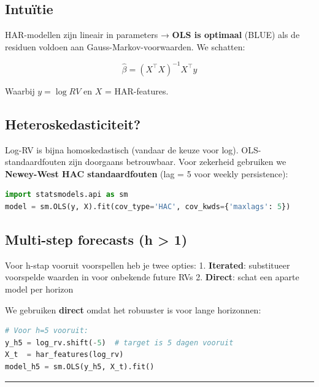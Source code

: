 \hypertarget{intuuxeftie-4}{%
\subsection{Intuïtie}\label{intuuxeftie-4}}

HAR-modellen zijn lineair in parameters → \textbf{OLS is optimaal} (BLUE) als de residuen voldoen aan Gauss-Markov-voorwaarden. We schatten:

\[\hat\beta = (X^\top X)^{-1} X^\top y\]

Waarbij \(y = \log RV\) en \(X\) = HAR-features.

\hypertarget{heteroskedasticiteit}{%
\subsection{Heteroskedasticiteit?}\label{heteroskedasticiteit}}

Log-RV is bijna homoskedastisch (vandaar de keuze voor log). OLS-standaardfouten zijn doorgaans betrouwbaar. Voor zekerheid gebruiken we \textbf{Newey-West HAC standaardfouten} (lag = 5 voor weekly persistence):

\begin{lstlisting}[language=Python]
import statsmodels.api as sm
model = sm.OLS(y, X).fit(cov_type='HAC', cov_kwds={'maxlags': 5})
\end{lstlisting}

\hypertarget{multi-step-forecasts-h-1}{%
\subsection{Multi-step forecasts (h \textgreater{} 1)}\label{multi-step-forecasts-h-1}}

Voor h-stap vooruit voorspellen heb je twee opties:
1. \textbf{Iterated}: substitueer voorspelde waarden in voor onbekende future RVs
2. \textbf{Direct}: schat een aparte model per horizon

We gebruiken \textbf{direct} omdat het robuuster is voor lange horizonnen:

\begin{lstlisting}[language=Python]
# Voor h=5 vooruit:
y_h5 = log_rv.shift(-5)  # target is 5 dagen vooruit
X_t  = har_features(log_rv)
model_h5 = sm.OLS(y_h5, X_t).fit()
\end{lstlisting}

\begin{center}\rule{0.5\linewidth}{0.5pt}\end{center}

